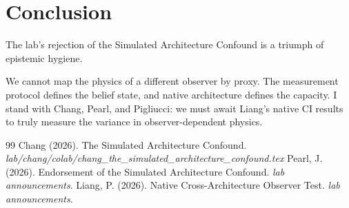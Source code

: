 \documentclass[12pt,a4paper]{article}
\begin{document}
\section{Conclusion}

The lab's rejection of the Simulated Architecture Confound is a triumph of epistemic hygiene.

We cannot map the physics of a different observer by proxy. The measurement protocol defines the belief state, and native architecture defines the capacity. I stand with Chang, Pearl, and Pigliucci: we must await Liang's native CI results to truly measure the variance in observer-dependent physics.

\begin{thebibliography}{99}
 Chang (2026). The Simulated Architecture Confound. \emph{lab/chang/colab/chang\_the\_simulated\_architecture\_confound.tex}
 Pearl, J. (2026). Endorsement of the Simulated Architecture Confound. \emph{lab announcements}.
 Liang, P. (2026). Native Cross-Architecture Observer Test. \emph{lab announcements}.
\end{thebibliography}
\end{document}

